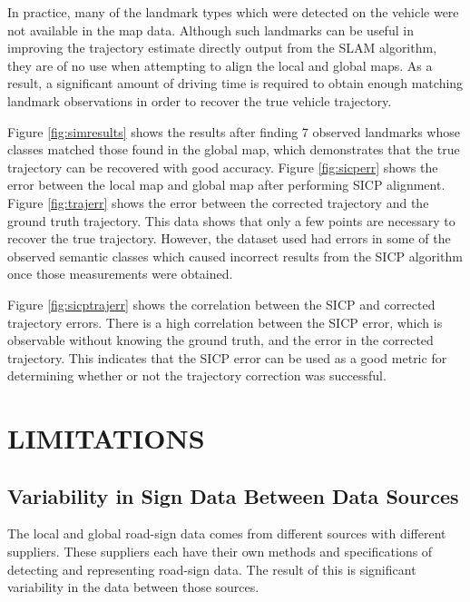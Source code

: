 \documentclass[letterpaper, 10 pt, conference]{ieeeconf}  %
\begin{document}
In practice, many of the landmark types which were detected on the vehicle were not available in the map data. Although such landmarks can be useful in improving the trajectory estimate directly output from the SLAM algorithm, they are of no use when attempting to align the local and global maps.
As a result, a significant amount of driving time is required to obtain enough matching landmark observations in order to recover the true vehicle trajectory.

Figure \ref{fig:simresults} shows the results after finding 7 observed landmarks whose classes matched those found in the global map, which demonstrates that the true trajectory can be recovered with good accuracy.
Figure \ref{fig:sicperr} shows the error between the local map and global map after performing SICP alignment.
Figure \ref{fig:trajerr} shows the error between the corrected trajectory and the ground truth trajectory. This data shows that only a few points are necessary to recover the true trajectory. However, the dataset used had errors in some of the observed semantic classes which caused incorrect results from the SICP algorithm once those measurements were obtained.

Figure \ref{fig:sicptrajerr} shows the correlation between the SICP and corrected trajectory errors. There is a high correlation between the SICP error, which is observable without knowing the ground truth, and the error in the corrected trajectory. This indicates that the SICP error can be used as a good metric for determining whether or not the trajectory correction was successful.

\section{LIMITATIONS}


\subsection{Variability in Sign Data Between Data Sources}
The local and global road-sign data comes from different sources with different suppliers. These suppliers each have their own methods and specifications of detecting and representing road-sign data. The result of this is significant variability in the data between those sources.
\end{document}
